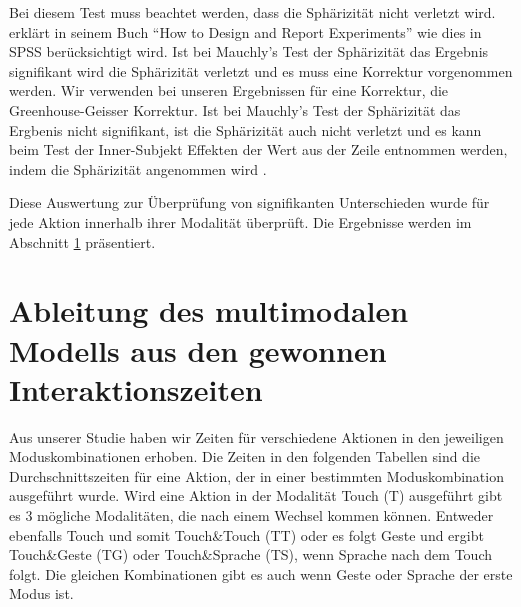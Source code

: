 Bei diesem Test muss beachtet werden, dass die Sphärizität nicht verletzt wird. 
\citet{field2002design} erklärt in seinem Buch "`How to Design and Report Experiments"' wie dies in SPSS berücksichtigt wird. 
Ist bei Mauchly's Test der Sphärizität das Ergebnis signifikant wird die Sphärizität verletzt und es muss eine Korrektur vorgenommen werden. 
Wir verwenden bei unseren Ergebnissen für eine Korrektur, die Greenhouse-Geisser Korrektur. 
Ist bei Mauchly's Test der Sphärizität das Ergbenis nicht signifikant, ist die Sphärizität auch nicht verletzt und es kann beim Test der Inner-Subjekt Effekten der Wert aus der Zeile entnommen werden, indem die Sphärizität angenommen wird \citep{field2002design}.

Diese Auswertung zur Überprüfung von signifikanten Unterschieden wurde für jede Aktion innerhalb ihrer Modalität überprüft. 
Die Ergebnisse werden im Abschnitt \ref{sec:Herleitung} präsentiert.

\section[Herleitung des Modells]{Ableitung des multimodalen Modells aus den gewonnen Interaktionszeiten}\label{sec:Herleitung}
Aus unserer Studie haben wir Zeiten für verschiedene Aktionen in den jeweiligen Moduskombinationen erhoben. 
Die Zeiten in den folgenden Tabellen sind die Durchschnittszeiten für eine Aktion, der in einer bestimmten Moduskombination ausgeführt wurde. 
Wird eine Aktion in der Modalität Touch (T) ausgeführt gibt es 3 mögliche Modalitäten, die nach einem Wechsel kommen können. 
Entweder ebenfalls Touch und somit Touch\&Touch (TT) oder es folgt Geste und ergibt Touch\&Geste (TG) oder Touch\&Sprache (TS), wenn Sprache nach dem Touch folgt. 
Die gleichen Kombinationen gibt es auch wenn Geste oder Sprache der erste Modus ist. 

